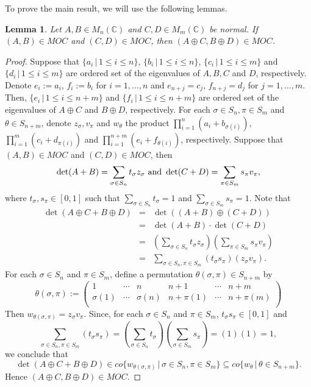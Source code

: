 \documentclass[11pt]{amsart}
\numberwithin{equation}{section}
\newtheorem{lem}[thm]{Lemma}
\numberwithin{equation}{section}
\begin{document}
To prove the main result, we will use the following lemmas.

\begin{lem}\label{tool1} Let  $A,B\in M_n(\mathbb{C})$ and $C,D\in M_m(\mathbb{C})$ be normal.  If $(A,B)\in MOC$ and $(C,D)\in MOC$, then $(A\oplus C, B\oplus D)\in MOC$.
\end{lem}
\begin{proof} Suppose that $\{a_i \,|\, 1\leq i\leq n \}$, $\{b_i \,|\, 1\leq i\leq n \}$, $\{c_i \,|\, 1\leq i\leq m \}$ and $\{d_i\,|\, 1\leq i\leq m \}$ are ordered set of the eigenvalues of $A,B,C$ and $D$, respectively.  Denote $e_i:=a_i$, $f_i:=b_i$ for $i=1,\dots,n$ and $e_{n+j}=c_j$, $f_{n+j}=d_j$ for $j=1,\dots,m$.  Then, $\{ e_i\,|\, 1\leq i \leq n+m\}$ and $\{ f_i\,|\, 1\leq i \leq n+m\}$ are ordered set of the eigenvalues of $A\oplus C$ and $B\oplus D$, respectively.  For each $\sigma\in S_n, \pi\in S_m$ and $\theta\in S_{n+m}$, denote $z_\sigma, v_\pi$ and $w_\theta$ the product $\prod_{i=1}^n(a_i+b_{\sigma(i)})$, $\prod_{i=1}^m(c_i+d_{\pi(i)})$ and $\prod_{i=1}^{n+m}(e_i+f_{\theta(i)})$, respectively.  Suppose that $(A,B)\in MOC$ and $(C,D)\in MOC$, then $$\det(A+B)=\sum_{\sigma\in S_n}t_\sigma z_\sigma  \hbox{ and } \det(C+D)=\sum_{\pi\in S_m}s_\pi v_\pi,$$ where $t_\sigma,s_\pi \in [0,1]$ such that $\sum_{\sigma\in S_n} t_\sigma=1$ and $\sum_{\sigma\in S_m} s_\pi=1$.  Note that
\begin{eqnarray*}
  \det(A\oplus C+B\oplus D) &=& \det((A+B)\oplus(C+D) )\\
   &=& \det(A+B)\cdot \det(C+D) \\
   &=&(\sum_{\sigma\in S_n}t_\sigma z_\sigma)(\sum_{\pi\in S_m}s_\pi v_\pi)\\
   &=& \sum_{\sigma\in S_n,\pi\in S_m}(t_\sigma s_\pi) (z_\sigma v_\pi).
\end{eqnarray*}
For each $\sigma\in S_n$ and $\pi\in S_m$, define a permutation $\theta(\sigma,\pi)\in S_{n+m}$ by $$\theta(\sigma,\pi):=\left(
                                                                             \begin{array}{cccccc}
                                                                               1 & \cdots & n & n+1 & \cdots & n+m \\
                                                                               \sigma(1) & \cdots & \sigma(n) & n+\pi(1) & \cdots & n+\pi(m) \\
                                                                             \end{array}
                                                                           \right)
$$
Then $w_{\theta(\sigma,\pi)}=z_\sigma v_\pi$.  Since, for each $\sigma\in S_n$ and $\pi\in S_m$, $t_\sigma s_\pi\in[0,1]$ and  $$\sum_{\sigma\in S_n,\pi\in S_m}(t_\sigma s_\pi)=(\sum_{\sigma\in S_n} t_\sigma)(\sum_{\sigma\in S_m} s_\pi)=(1)(1)=1,$$
we conclude that  $$\det(A\oplus C+B\oplus D)\in co\{ w_{\theta(\sigma,\pi)} \,|\, \sigma\in S_n,\pi\in S_m\}\subseteq co\{w_\theta \,|\, \theta\in S_{n+m} \}.$$
Hence $(A\oplus C, B\oplus D)\in MOC$.
\end{proof}
\end{document}
